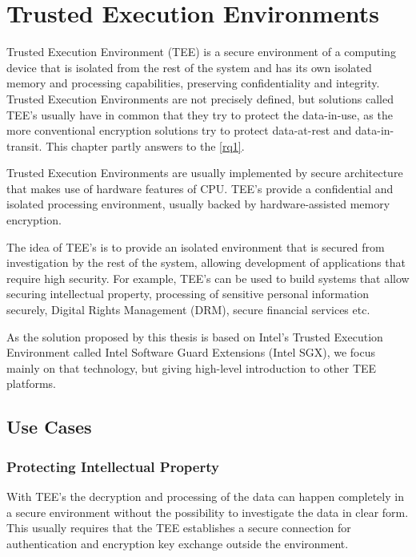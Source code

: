 \chapter{Trusted Execution Environments} \label{tees}

Trusted Execution Environment (TEE) is a secure environment of a computing device that is isolated from the rest of the system and has its own isolated memory and processing capabilities, preserving confidentiality and integrity. Trusted Execution Environments are not precisely defined, but solutions called TEE's usually have in common that they try to protect the data-in-use, as the more conventional encryption solutions try to protect data-at-rest and data-in-transit. This chapter partly answers to the \ref{rq1}.

Trusted Execution Environments are usually implemented by secure architecture that makes use of hardware features of CPU. TEE's provide a confidential and isolated processing environment, usually backed by hardware-assisted memory encryption.

The idea of TEE's is to provide an isolated environment that is secured from investigation by the rest of the system, allowing development of applications that require high security. For example, TEE's can be used to build systems that allow securing intellectual property, processing of sensitive personal information securely, Digital Rights Management (DRM), secure financial services etc.\cite{teeieee}

As the solution proposed by this thesis is based on Intel's Trusted Execution Environment called Intel Software Guard Extensions (Intel SGX), we focus mainly on that technology, but giving high-level introduction to other TEE platforms.

\section{Use Cases}\label{usecases}

\subsection{Protecting Intellectual Property}\label{protecting1}


With TEE's the decryption and processing of the data can happen completely in a secure environment without the possibility to investigate the data in clear form. This usually requires that the TEE establishes a secure connection for authentication and encryption key exchange outside the environment.

